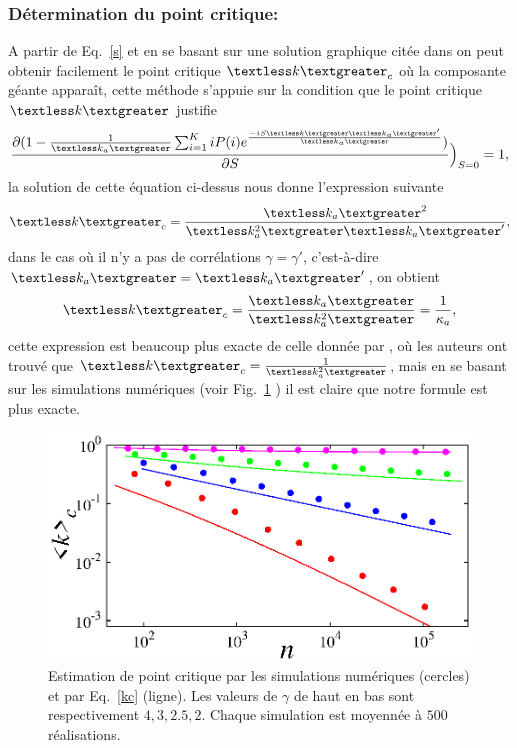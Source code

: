  \subsubsection{Détermination du point critique:}
 A partir de Eq.~\eqref{s} et en se basant sur une solution graphique citée dans \cite{Newman2010-403} on peut obtenir facilement le point critique $\km_c$ où la composante géante apparaît, cette méthode s'appuie sur la condition que le point critique $\km$ justifie  
 \begin{equation}
 \frac{\partial (1-\frac{1}{\kma}\sum_{i=1}^KiP(i)e^{\frac{-iS\km\kma'}{\kma}})}{\partial S}\Big)_{S=0}=1,
 \end{equation}
 la solution de cette équation ci-dessus nous donne l'expression suivante
 \begin{equation}
\km_c=\frac{\kma^2}{\kmaa\kma'},
 \end{equation}
 dans le cas où il n'y a pas de corrélations $\gamma=\gamma'$, c'est-à-dire $\kma=\kma'$, on obtient 
  \begin{equation}
  \km_c=\frac{\kma}{\kmaa}=\frac{1}{\kappa_a},
  \label{kc}
  \end{equation}
   cette expression est beaucoup plus exacte de celle donnée par \cite{Cho-al2010}, où les auteurs ont trouvé que $\km_c=\frac{1}{\kmaa}$, mais en se basant sur les simulations numériques (voir Fig.~\ref{PC} ) il est claire que notre formule est plus exacte.\\
\begin{figure}[h!]
	\centering
	\includegraphics[scale=1.2]{./figures/fig-PC}
	\caption{Estimation de point critique par les simulations numériques (cercles) et par Eq.~\eqref{kc} (ligne). Les valeurs de $\gamma$ de haut en bas sont respectivement $4,3,2.5,2$. Chaque simulation est moyennée à $500$ réalisations. }
	\label{PC}
\end{figure}

